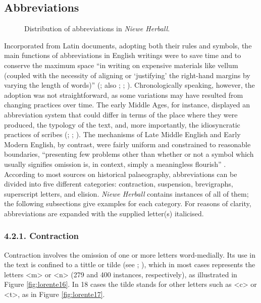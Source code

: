 \begin{paper}
\subsection{Abbreviations}

\begin{figure}[H]
    \centering
    \caption{Distribution of abbreviations in \emph{Niewe Herball}.}
    \label{fig:lorente15}
\end{figure}

Incorporated from Latin documents, adopting both their rules and
symbols, the main functions of abbreviations in English writings were to
save time and to conserve the maximum space ``in writing on expensive
materials like vellum (coupled with the necessity of aligning or
`justifying' the right-hand margins by varying the length of words)''
(\cite[218]{greetham_textual_1994}; also \cite[119]{tannenbaum_handwriting_1930}; \cite[22]{petti_english_1977};
\cite[115]{calle-martin_corpus-based_2021}). Chronologically speaking, however, the adoption
was not straightforward, as some variations may have resulted from changing practices over time. The early Middle Ages, for
instance, displayed an abbreviation system that could differ in terms of
the place where they were produced, the typology of the text, and, more
importantly, the idiosyncratic practices of scribes (\cite[22]{petti_english_1977};
\cite[187]{derolez_palaeography_2003}; \cite[89]{clemens_introduction_2007}). The mechanisms of Late
Middle English and Early Modern English, by contrast, were fairly
uniform and constrained to reasonable boundaries, ``presenting few
problems other than whether or not a symbol which usually signifies
omission is, in context, simply a meaningless flourish'' \citep[22]{petti_english_1977}. According to most sources on historical
palaeography, abbreviations can be divided into five different categories: contraction, suspension,
brevigraphs, superscript letters, and elision. \emph{Niewe Herball}
contains instances of all of them; the following subsections give examples for each category. For reasons of clarity, abbreviations are
  expanded with the supplied letter(s) italicised.

\subsubsection{4.2.1. Contraction}

Contraction involves the omission of one or more letters word-medially.
Its use in the text is confined to a tittle or tilde (see \cite[119--120]{tannenbaum_handwriting_1930}; \cite[118]{calle-martin_corpus-based_2021}), which in most cases represents
the letters \textless m\textgreater{} or \textless n\textgreater{} (279
and 400 instances, respectively), as illustrated in Figure \ref{fig:lorente16}. In 18 cases the tilde stands for other letters such as
\textless c\textgreater{} or \textless t\textgreater, as in Figure \ref{fig:lorente17}.


\end{paper}
